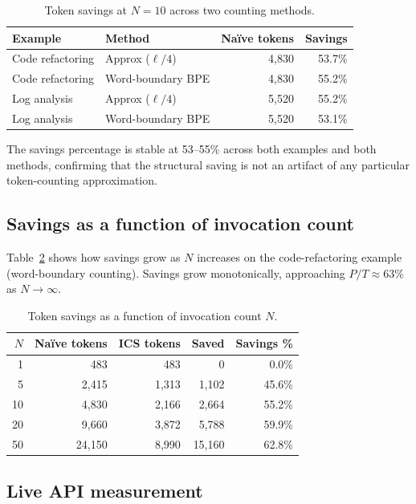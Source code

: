 \documentclass[11pt]{article}
\begin{document}
\begin{table}[h]
\centering
\caption{Token savings at $N{=}10$ across two counting methods.}
\label{tab:counting}
\begin{tabular}{llrr}
\toprule
\textbf{Example} & \textbf{Method} & \textbf{Na\"{i}ve tokens} & \textbf{Savings} \\
\midrule
Code refactoring & Approx ($\ell/4$) & 4,830 & 53.7\% \\
Code refactoring & Word-boundary BPE & 4,830 & 55.2\% \\
Log analysis     & Approx ($\ell/4$) & 5,520 & 55.2\% \\
Log analysis     & Word-boundary BPE & 5,520 & 53.1\% \\
\bottomrule
\end{tabular}
\end{table}

The savings percentage is stable at 53--55\% across both examples and both
methods, confirming that the structural saving is not an artifact of any
particular token-counting approximation.

\subsection{Savings as a function of invocation count}
\label{sec:scaling}

Table~\ref{tab:scaling} shows how savings grow as $N$ increases on the
code-refactoring example (word-boundary counting). Savings grow
monotonically, approaching $P/T \approx 63\%$ as $N \to \infty$.

\begin{table}[h]
\centering
\caption{Token savings as a function of invocation count $N$.}
\label{tab:scaling}
\begin{tabular}{rrrrr}
\toprule
$N$ & Na\"{i}ve tokens & ICS tokens & Saved & Savings \% \\
\midrule
1  & 483    & 483    & 0      & 0.0\%  \\
5  & 2,415  & 1,313  & 1,102  & 45.6\% \\
10 & 4,830  & 2,166  & 2,664  & 55.2\% \\
20 & 9,660  & 3,872  & 5,788  & 59.9\% \\
50 & 24,150 & 8,990  & 15,160 & 62.8\% \\
\bottomrule
\end{tabular}
\end{table}

\subsection{Live API measurement}
\label{sec:live}
\end{document}

